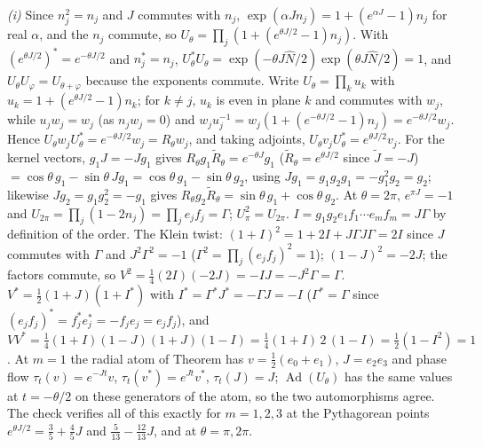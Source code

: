 \emph{(i)} Since $n_{j}^{2} = n_{j}$ and $J$ commutes with $n_{j}$, $\exp(\alpha Jn_{j}) = 1 + (e^{\alpha J} - 1)n_{j}$ for real $\alpha$, and the $n_{j}$ commute, so $U_{\theta} = \prod_{j}(1 + (e^{\theta J/2} - 1)n_{j})$. With $(e^{\theta J/2})^{*} = e^{-\theta J/2}$ and $n_{j}^{*} = n_{j}$, $U_{\theta}^{*}U_{\theta} = \exp(-\theta J\hat N/2)\exp(\theta J\hat N/2) = 1$, and $U_{\theta}U_{\varphi} = U_{\theta + \varphi}$ because the exponents commute. Write $U_{\theta} = \prod_{k}u_{k}$ with $u_{k} = 1 + (e^{\theta J/2} - 1)n_{k}$; for $k \ne j$, $u_{k}$ is even in plane $k$ and commutes with $w_{j}$, while $u_{j}w_{j} = w_{j}$ (as $n_{j}w_{j} = 0$) and $w_{j}u_{j}^{-1} = w_{j}(1 + (e^{-\theta J/2} - 1)n_{j}) = e^{-\theta J/2}w_{j}$. Hence $U_{\theta}w_{j}U_{\theta}^{*} = e^{-\theta J/2}w_{j} = R_{\theta}w_{j}$, and taking adjoints, $U_{\theta}v_{j}U_{\theta}^{*} = e^{\theta J/2}v_{j}$. For the kernel vectors, $g_{1}J = -Jg_{1}$ gives $R_{\theta}g_{1}\tilde R_{\theta} = e^{-\theta J}g_{1}$ ($\tilde R_{\theta} = e^{\theta J/2}$ since $\tilde J = -J$) $= \cos\theta\,g_{1} - \sin\theta\,Jg_{1} = \cos\theta\,g_{1} - \sin\theta\,g_{2}$, using $Jg_{1} = g_{1}g_{2}g_{1} = -g_{1}^{2}g_{2} = g_{2}$; likewise $Jg_{2} = g_{1}g_{2}^{2} = -g_{1}$ gives $R_{\theta}g_{2}\tilde R_{\theta} = \sin\theta\,g_{1} + \cos\theta\,g_{2}$. At $\theta = 2\pi$, $e^{\pi J} = -1$ and $U_{2\pi} = \prod_{j}(1 - 2n_{j}) = \prod_{j}e_{j}f_{j} = \Gamma$; $U_{\pi}^{2} = U_{2\pi}$. $I = g_{1}g_{2}e_{1}f_{1}\cdots e_{m}f_{m} = J\Gamma$ by definition of the order. The Klein twist: $(1 + I)^{2} = 1 + 2I + J\Gamma J\Gamma = 2I$ since $J$ commutes with $\Gamma$ and $J^{2}\Gamma^{2} = -1$ ($\Gamma^{2} = \prod_{j}(e_{j}f_{j})^{2} = 1$); $(1 - J)^{2} = -2J$; the factors commute, so $V^{2} = \tfrac14(2I)(-2J) = -IJ = -J^{2}\Gamma = \Gamma$. $V^{*} = \tfrac12(1 + J)(1 + I^{*})$ with $I^{*} = \Gamma^{*}J^{*} = -\Gamma J = -I$ ($\Gamma^{*} = \Gamma$ since $(e_{j}f_{j})^{*} = f_{j}^{*}e_{j}^{*} = -f_{j}e_{j} = e_{j}f_{j}$), and $VV^{*} = \tfrac14(1 + I)(1 - J)(1 + J)(1 - I) = \tfrac14(1 + I)\,2\,(1 - I) = \tfrac12(1 - I^{2}) = 1$. At $m = 1$ the radial atom of Theorem  has $v = \tfrac12(e_{0} + e_{1})$, $J = e_{2}e_{3}$ and phase flow $\tau_{t}(v) = e^{-Jt}v$, $\tau_{t}(v^{*}) = e^{Jt}v^{*}$, $\tau_{t}(J) = J$; $\operatorname{Ad}(U_{\theta})$ has the same values at $t = -\theta/2$ on these generators of the atom, so the two automorphisms agree. The check verifies all of this exactly for $m = 1, 2, 3$ at the Pythagorean points $e^{\theta J/2} = \tfrac35 + \tfrac45J$ and $\tfrac{5}{13} - \tfrac{12}{13}J$, and at $\theta = \pi, 2\pi$.

